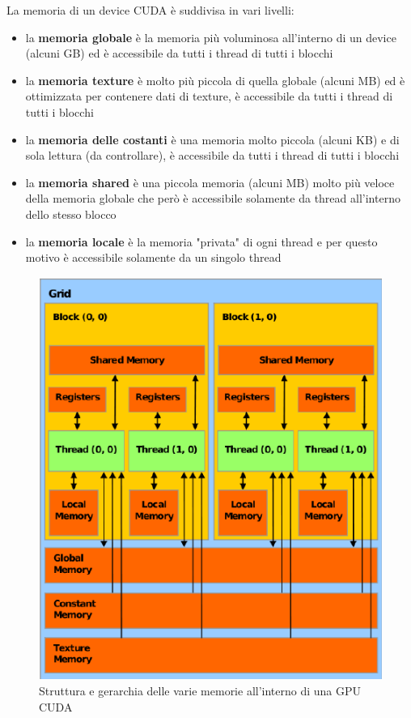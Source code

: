 \documentclass[12pt,a4paper]{book} %
\begin{document}
	La memoria di un device CUDA è suddivisa in vari livelli:
	\begin{itemize}
		\item la \textbf{memoria globale} è la memoria più voluminosa all'interno di un device (alcuni GB) ed è accessibile da tutti i thread di tutti i blocchi
		\item la \textbf{memoria texture} è molto più piccola di quella globale (alcuni MB) ed è ottimizzata per contenere dati di texture, è accessibile da tutti i thread di tutti i blocchi
		\item la \textbf{memoria delle costanti} è una memoria molto piccola (alcuni KB) e di sola lettura (da controllare), è accessibile da tutti i thread di tutti i blocchi
		\item la \textbf{memoria shared} è una piccola memoria (alcuni MB) molto più veloce della memoria globale che però è accessibile solamente da thread all'interno dello stesso blocco
		\item la \textbf{memoria locale} è la memoria "privata" di ogni thread e per questo motivo è accessibile solamente da un singolo thread
	\end{itemize}
	
	\begin{figure}[!ht]
		\centering
		\includegraphics[width=0.5\linewidth]{CUDA-memory-model}
		\caption[Struttura della memoria di una GPU CUDA]{Struttura e gerarchia delle varie memorie all'interno di una GPU CUDA}
		\label{fig:cuda-memory-model}
	\end{figure}
	
\end{document}
